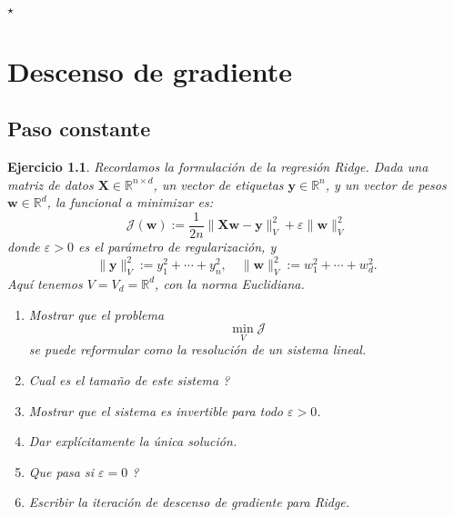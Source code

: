 \documentclass[11pt]{report}
\newtheorem{ex}{Ejercicio}
\newcommand{\norma}[1]{\Vert #1 \Vert_V}
\begin{document}

\begin{center}
    $\star$
\end{center}

\chapter{Descenso de gradiente}

\section{Paso constante}

\begin{ex}
Recordamos la formulación de la regresión Ridge. Dada una matriz de datos $ \mathbf{X} \in \mathbb{R}^{n \times d} $, un vector de etiquetas $ \mathbf{y} \in \mathbb{R}^n $, y un vector de pesos $ \mathbf{w} \in \mathbb{R}^d $, la funcional a minimizar es:
$$
\mathcal{J}(\mathbf{w}) := \frac{1}{2n} \| \mathbf{X}\mathbf{w} - \mathbf{y}\|_V^2 + \varepsilon \|\mathbf{w}\|_V^2
$$
donde $ \varepsilon > 0 $ es el parámetro de regularización, y
\[
\|  \mathbf{y}\|_V^2 := y_1^2 + \cdots + y_n^2, \quad
\|\mathbf{w}\|_V^2 := w_1^2 + \cdots + w_d^2. 
\]
Aquí tenemos $V = V_d = \mathbb{R}^d$, con la norma Euclidiana. %

\begin{enumerate}
    \item Mostrar que el problema
    \[
    \min_V \mathcal{J}
    \]
    se puede reformular como la resolución de un sistema lineal.
    
    \item Cual es el tamaño de este sistema ? 
    
    \item Mostrar que el sistema es invertible para todo $\varepsilon > 0$.
    
    \item Dar explícitamente la única solución.
    
    \item Que pasa si $\varepsilon = 0$ ?
    
    \item Escribir la iteración de descenso de gradiente para Ridge.
\end{enumerate}
\end{ex}
\end{document}
